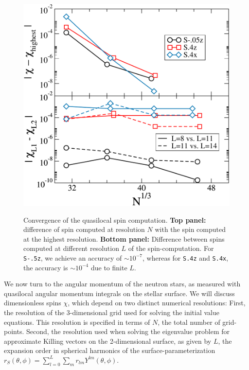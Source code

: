 \begin{figure}
\includegraphics[width=0.95\columnwidth]{chap2/SpinConvergence}\\


\caption[Convergence of the quasilocal spin computation.]{\label{fig:SpinConvergence} Convergence of the quasilocal
  spin computation. {\bf Top panel:} difference of spin computed at
  resolution $N$ with the spin computed at the highest resolution.
  {\bf Bottom panel:} Difference between spins computed at different
  resolution $L$ of the spin-computation. For {\tt S-.5z}, we achieve an
  accuracy of $\sim 10^{-7}$, whereas for {\tt S.4z} and {\tt S.4x}, the accuracy
  is $\sim 10^{-4}$ due to finite $L$.}
\end{figure}

We now turn to the angular momentum of the neutron stars, as measured
with quasilocal angular momentum integrals on the stellar surface.
We will discuss dimensionless spins $\chi$, which depend on two
distinct numerical resolutions: First, the resolution of the
3-dimensional grid used for solving the initial value equations. This
resolution is specified in terms of $N$, the total number of
grid-points. Second, the resolution used when solving the eigenvalue
problem for approximate Killing vectors on the 2-dimensional surface,
as given by $L$, the expansion order in spherical harmonics of
  the surface-parameterization
  $r_S(\theta,\phi)=\sum_{l=0}^L\sum_m r_{lm}Y^{lm}(\theta,\phi)$.

